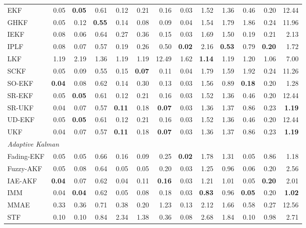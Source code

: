 \begin{longtable}{lrrrrrrrrrrrr}
\quad EKF & 0.05 & \textbf{0.05} & 0.61 & 0.12 & 0.21 & 0.16 & 0.03 & 1.52 & 1.36 & 0.46 & 0.20 & 12.44 \\
\quad GHKF & 0.05 & 0.12 & \textbf{0.55} & 0.14 & 0.08 & 0.09 & 0.04 & 1.54 & 1.79 & 1.86 & 0.24 & 11.96 \\
\quad IEKF & 0.08 & 0.06 & 0.64 & 0.27 & 0.36 & 0.15 & 0.03 & 1.69 & 1.50 & 0.19 & 0.21 & 2.13 \\
\quad IPLF & 0.08 & 0.07 & 0.57 & 0.19 & 0.26 & 0.50 & \textbf{0.02} & 2.16 & \textbf{0.53} & 0.79 & \textbf{0.20} & 1.72 \\
\quad LKF & 1.19 & 2.19 & 1.36 & 1.19 & 1.19 & 12.49 & 1.62 & \textbf{1.14} & 1.19 & 1.20 & 1.06 & 7.00 \\
\quad SCKF & 0.05 & 0.09 & 0.55 & 0.15 & \textbf{0.07} & 0.11 & 0.04 & 1.79 & 1.59 & 1.92 & 0.24 & 11.26 \\
\quad SO-EKF & \textbf{0.04} & 0.08 & 0.62 & 0.14 & 0.30 & 0.13 & 0.03 & 1.56 & 0.89 & \textbf{0.18} & 0.20 & 1.28 \\
\quad SR-EKF & 0.05 & \textbf{0.05} & 0.61 & 0.12 & 0.21 & 0.16 & 0.03 & 1.52 & 1.36 & 0.46 & 0.20 & 12.44 \\
\quad SR-UKF & 0.04 & 0.07 & 0.57 & \textbf{0.11} & 0.18 & \textbf{0.07} & 0.03 & 1.36 & 1.37 & 0.86 & 0.23 & \textbf{1.19} \\
\quad UD-EKF & 0.05 & \textbf{0.05} & 0.61 & 0.12 & 0.21 & 0.16 & 0.03 & 1.52 & 1.36 & 0.46 & 0.20 & 12.44 \\
\quad UKF & 0.04 & 0.07 & 0.57 & \textbf{0.11} & 0.18 & \textbf{0.07} & 0.03 & 1.36 & 1.37 & 0.86 & 0.23 & \textbf{1.19} \\
\multicolumn{13}{l}{\textit{Adaptive Kalman}} \\
\quad Fading-EKF & 0.05 & 0.05 & 0.66 & 0.16 & 0.09 & 0.25 & \textbf{0.02} & 1.78 & 1.31 & 0.05 & 0.86 & 1.18 \\
\quad Fuzzy-AKF & 0.05 & 0.08 & 0.64 & 0.05 & 0.05 & 0.20 & 0.03 & 1.25 & 0.96 & 0.06 & 0.20 & 2.56 \\
\quad IAE-AKF & \textbf{0.04} & 0.07 & 0.62 & 0.04 & 0.11 & \textbf{0.16} & 0.03 & 1.21 & 1.01 & 0.05 & \textbf{0.20} & 2.01 \\
\quad IMM & 0.04 & \textbf{0.04} & 0.62 & 0.05 & 0.08 & 0.18 & 0.03 & \textbf{0.83} & 0.96 & \textbf{0.05} & 0.20 & \textbf{1.02} \\
\quad MMAE & 0.33 & 0.36 & 0.71 & 0.38 & 0.20 & 1.23 & 0.13 & 2.12 & 1.66 & 0.58 & 0.27 & 12.56 \\
\quad STF & 0.10 & 0.10 & 0.84 & 2.34 & 1.38 & 0.36 & 0.08 & 2.68 & 1.84 & 0.10 & 0.98 & 2.71 \\

\end{longtable}
